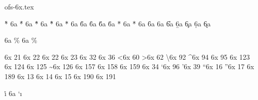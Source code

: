 

\protectreading ofs-6x.tex %
 
\accentdef  \` *    6a  {}
\accentdef  \' *    6a  {}
\accentdef  \^ *    6a  {}
\accentdef  \~ *    6a  {}
\accentdef  \" *    6a  {}
\accentdef  \H *    6a  {}
\accentdef  \r *    6a  {}
\accentdef  \v *    6a  {}
\accentdef  \u *    6a  {}
\accentdef  \= *    6a  {}
\accentdef  \. *    6a  {}
\accentdef  \f *    6a  {}
\accentdef  \C *    6a  {}
\accentdef  \U *    6a  {}
\accentdef  \b *    6a  {}
\accentdef  \c *    6a  {}
\accentdef  \d *    6a  {}
\accentdef  \k *    6a  {}

\let\promile=\relax
\characterdef \promile          6a {\% }        
\characterdef \pertenthousand   6a {\% } 

\characterdef \textendash         6x  21
\characterdef \cyrdash            6x  22
\characterdef \textemdash         6x  22
\characterdef \textcompwordmark   6x  23
\characterdef \textvisiblespace   6x  32
\characterdef \textdollar         6x  36
\characterdef \textless           6x  60
\characterdef \textgreater        6x  62
\characterdef \textbackslash      6x  92
\characterdef \textasciicircum    6x  94
\characterdef \textunderscore     6x  95
\characterdef \textbraceleft      6x  123
\characterdef \textbar            6x  124
\characterdef \textbraceright     6x  125
\characterdef \textasciitilde     6x  126
\characterdef \textnumero         6x  157
\characterdef \textcurrency       6x  158
\characterdef \textsection        6x  159
\characterdef \textquotedbl       6x  34
\characterdef \textquoteleft      6x  96
\characterdef \textquoteright     6x  39
\characterdef \textquotedblleft   6x  16
\characterdef \textquotedblright  6x  17
\characterdef \quotedblbase       6x  189
\characterdef \CYRpalochka        6x  13
\characterdef \cyrlangle          6x  14
\characterdef \cyrrangle          6x  15
\characterdef \guillemotleft      6x  190
\characterdef \guillemotright     6x  191
                        
\accentdef  \. i     6a  `\i

